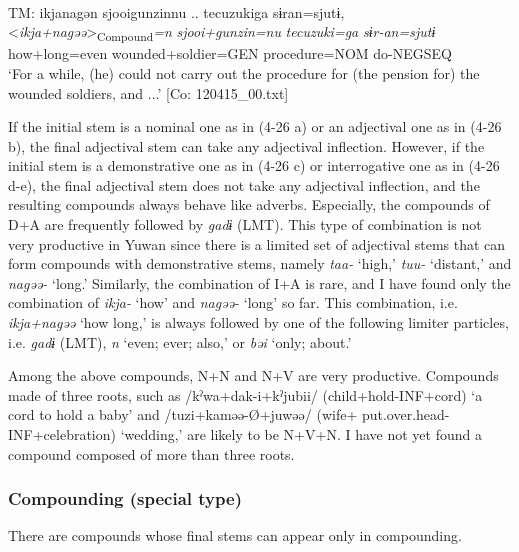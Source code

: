 \ex{}\\\label{ex:4.26e}
\glll    TM:  ikjanagən  {\textbar}sjooigunzin{\textbar}nu ..  {\textbar}tecuzuki{\textbar}ga  sɨran=sjutɨ,    \\
      <\textit{ikja+nagəə}>\textsubscript{Compound}\textit{=n}  \textit{sjooi+gunzin=nu}  \textit{tecuzuki=ga}       \textit{sɨr-an=sjutɨ}    \\
      how+long=even  wounded+soldier=GEN  procedure=NOM     do-NEGSEQ        \\
    \glt       ‘For a while, (he) could not carry out the procedure for (the pension for) the wounded soldiers, and ...’ [Co: 120415\_00.txt]
    \z
\z

If the initial stem is a nominal one as in (4-26 a) or an adjectival one as in (4-26 b), the final adjectival stem can take any adjectival inflection. However, if the initial stem is a demonstrative one as in (4-26 c) or interrogative one as in (4-26 d-e), the final adjectival stem does not take any adjectival inflection, and the resulting compounds always behave like adverbs. Especially, the compounds of D+A are frequently followed by \textit{gadɨ} (LMT). This type of combination is not very productive in Yuwan since there is a limited set of adjectival stems that can form compounds with demonstrative stems, namely \textit{taa-} ‘high,’ \textit{tuu-} ‘distant,’ and \textit{nagəə-} ‘long.’ Similarly, the combination of I+A is rare, and I have found only the combination of \textit{ikja-} ‘how’ and \textit{nagəə-} ‘long’ so far. This combination, i.e. \textit{ikja+nagəə} ‘how long,’ is always followed by one of the following limiter particles, i.e. \textit{gadɨ} (LMT), \textit{n} ‘even; ever; also,’ or \textit{bəi} ‘only; about.’

Among the above compounds, N+N and N+V are very productive. Compounds made of three roots, such as /kˀwa+dak-i+kˀjubii/ (child+hold-INF+cord) ‘a cord to hold a baby’ and /tuzi+kaməə-Ø+juwəə/ (wife+ put.over.head-INF+celebration) ‘wedding,’ are likely to be N+V+N. I have not yet found a compound composed of more than three roots.

\subsubsection{Compounding (special type)}\label{sec:4.2.3.2}

There are compounds whose final stems can appear only in compounding.

